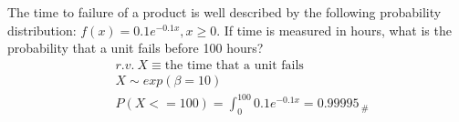 The time to failure of a product is well described by the following probability distribution: $f(x) = 0.1e^{-0.1x}, x \geq 0$. If time is measured in hours, what is the probability that a unit fails before 100 hours?
    \begin{align*}
        &r.v. \ X \equiv \text{the time that a unit fails}\\
        &X \sim exp(\beta = 10)\\
        &P(X <= 100) = \int_{0}^{100} 0.1e^{-0.1x} = 0.99995_{ \ \#}\\
    \end{align*}


